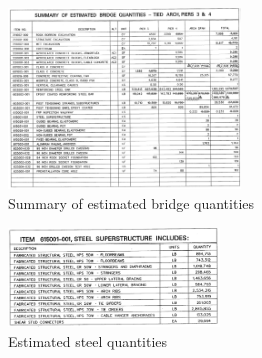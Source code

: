\begin{figure}[H]
    \centering
    \includegraphics[trim={0 1.4cm 0 0},clip, width=0.55\textwidth]{overleaf/Appendix/Design drawings/estimated bridge quantities.PNG}
    \caption{Summary of estimated bridge quantities}
    \label{fig:bridge_quantities}
\end{figure}
\begin{figure}[H]
    \centering
    \includegraphics[trim={0 0cm 0 0.2cm},clip, width=0.5\textwidth]{overleaf/Appendix/Design drawings/Steel superstructure.PNG}
    \caption{Estimated steel quantities}
    \label{fig:steel_quantities}
\end{figure}

\begin{table}[H]
\centering
\caption{Estimated weights of the components}
\label{tab:weights}
\end{table}

